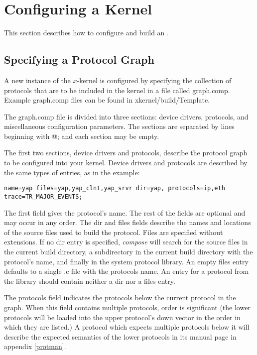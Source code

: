 %
%
%

\section{Configuring a Kernel}
\label{config}

This section describes how to configure and build an \xk{}.

\subsection{Specifying a Protocol Graph}
\label{compose}

A new instance of the $x$-kernel is configured by specifying the
collection of protocols that are to be included in the kernel in a
file called {\sanss graph.comp}. Example {\sanss graph.comp} files can
be found in {\sanss xkernel/build/Template}.

The {\sanss graph.comp} file is divided into three sections: device
drivers, protocols, and miscellaneous configuration parameters.  The
sections are separated by lines beginning with {\sanss @;} and each
section may be empty.

The first two sections, device drivers and protocols, describe the
protocol graph to be configured into your kernel.  Device drivers and
protocols are described by the same types of entries, as in the
example:

\let\tt=\COURIERtt
\begin{verbatim}
name=yap files=yap,yap_clnt,yap_srvr dir=yap, protocols=ip,eth trace=TR_MAJOR_EVENTS;
\end{verbatim}
\let\tt=\CMRtt

The first field gives the protocol's name.  The rest of the fields are
optional and may occur in any order.  The {\sanss dir} and {\sanss files}
fields describe the names and locations of the source files used to
build the protocol.  Files are specified without extensions.  If no
dir entry is specified, {\em compose} will search for the source files in the
current build directory, a subdirectory in the current build directory
with the protocol's name, and finally in the system protocol library.
An empty {\sanss files} entry defaults to a single {\sanss .c} file with the
protocols name.  An entry for a protocol from the library should
contain neither a {\sanss dir} nor a {\sanss files} entry.

The {\sanss protocols} field indicates the protocols below the current
protocol in the graph.  When this field contains multiple protocols, order is
significant (the lower protocols will be loaded into the upper
protocol's down vector in the order in which they are listed.)
A protocol which expects multiple protocols below it will describe the
expected semantics of the lower protocols in its manual page in
appendix \ref{protman}.


